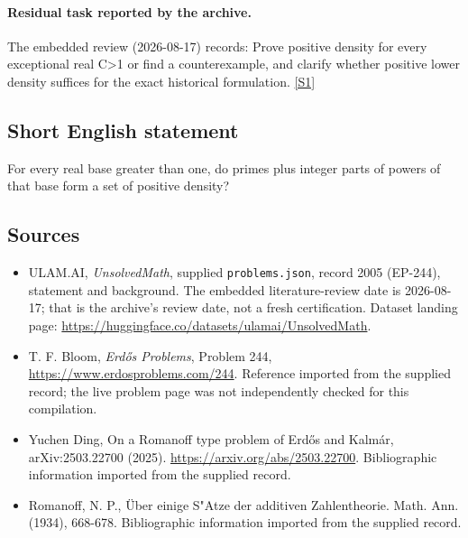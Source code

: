 \documentclass[11pt,a4paper]{article}
\newcommand{\sref}[2]{\hyperlink{source:#1:#2}{[S#2]}}
\begin{document}
\paragraph{Residual task reported by the archive.}

The embedded review (2026-08-17) records: Prove positive density for every exceptional real C>1 or find a counterexample, and clarify whether positive lower density suffices for the exact historical formulation. \sref{2005}{1}

\subsection{Short English statement}

For every real base greater than one, do primes plus integer parts of powers of that base form a set of positive density?

\subsection{Sources}

{\small

\begin{itemize}

\item[\hypertarget{source:2005:1}{S1}] ULAM.AI, \emph{UnsolvedMath}, supplied \texttt{problems.json}, record 2005 (EP-244), statement and background. The embedded literature-review date is 2026-08-17; that is the archive’s review date, not a fresh certification. Dataset landing page: \url{https://huggingface.co/datasets/ulamai/UnsolvedMath}.

\item[\hypertarget{source:2005:2}{S2}] T. F. Bloom, \emph{Erdős Problems}, Problem 244, \url{https://www.erdosproblems.com/244}. Reference imported from the supplied record; the live problem page was not independently checked for this compilation.

\item[\hypertarget{source:2005:3}{S3}] Yuchen Ding, On a Romanoff type problem of Erdős and Kalmár, arXiv:2503.22700 (2025). \url{https://arxiv.org/abs/2503.22700}. Bibliographic information imported from the supplied record.

\item[\hypertarget{source:2005:4}{S4}] Romanoff, N. P., \"{U}ber einige S"Atze der additiven Zahlentheorie. Math. Ann. (1934), 668-678. Bibliographic information imported from the supplied record.

\end{itemize}

}

\label{end:2005}
\end{document}
